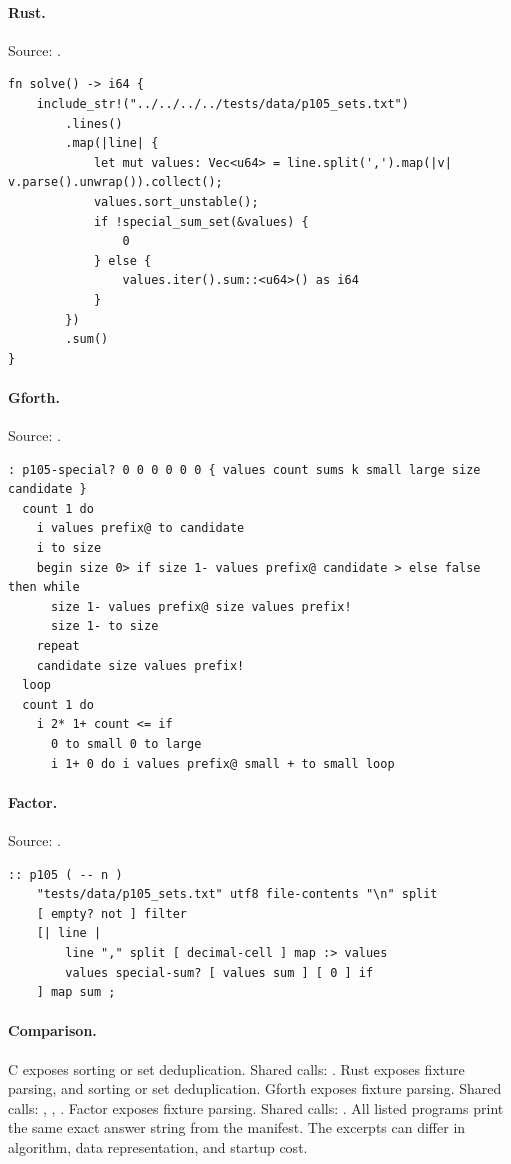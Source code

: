\paragraph{Rust.} Source: .
\begin{lstlisting}
fn solve() -> i64 {
    include_str!("../../../../tests/data/p105_sets.txt")
        .lines()
        .map(|line| {
            let mut values: Vec<u64> = line.split(',').map(|v| v.parse().unwrap()).collect();
            values.sort_unstable();
            if !special_sum_set(&values) {
                0
            } else {
                values.iter().sum::<u64>() as i64
            }
        })
        .sum()
}
\end{lstlisting}

\paragraph{Gforth.} Source: .
\begin{lstlisting}
: p105-special? 0 0 0 0 0 0 { values count sums k small large size candidate }
  count 1 do
    i values prefix@ to candidate
    i to size
    begin size 0> if size 1- values prefix@ candidate > else false then while
      size 1- values prefix@ size values prefix!
      size 1- to size
    repeat
    candidate size values prefix!
  loop
  count 1 do
    i 2* 1+ count <= if
      0 to small 0 to large
      i 1+ 0 do i values prefix@ small + to small loop
\end{lstlisting}

\paragraph{Factor.} Source: .
\begin{lstlisting}
:: p105 ( -- n )
    "tests/data/p105_sets.txt" utf8 file-contents "\n" split
    [ empty? not ] filter
    [| line |
        line "," split [ decimal-cell ] map :> values
        values special-sum? [ values sum ] [ 0 ] if
    ] map sum ;
\end{lstlisting}

\paragraph{Comparison.}
C exposes sorting or set deduplication. Shared calls: \texttt{}. Rust exposes fixture parsing, and sorting or set deduplication. Gforth exposes fixture parsing. Shared calls: \texttt{}, \texttt{}, \texttt{}. Factor exposes fixture parsing. Shared calls: \texttt{}.
All listed programs print the same exact answer string from the manifest. The excerpts can differ in algorithm, data representation, and startup cost.

